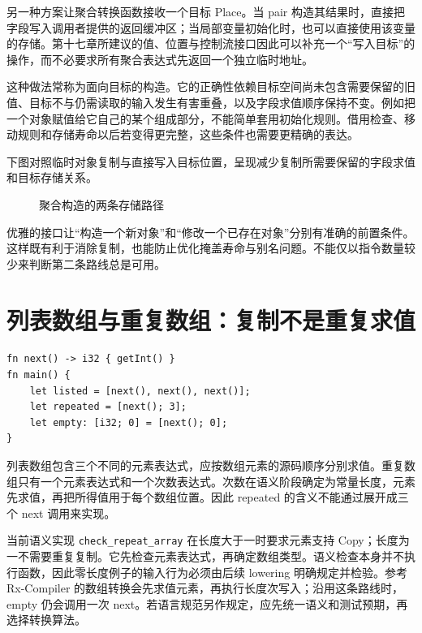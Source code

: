 另一种方案让聚合转换函数接收一个目标 Place。当 pair 构造其结果时，直接把字段写入调用者提供的返回缓冲区；当局部变量初始化时，也可以直接使用该变量的存储。第十七章所建议的值、位置与控制流接口因此可以补充一个“写入目标”的操作，而不必要求所有聚合表达式先返回一个独立临时地址。

这种做法常称为面向目标的构造。它的正确性依赖目标空间尚未包含需要保留的旧值、目标不与仍需读取的输入发生有害重叠，以及字段求值顺序保持不变。例如把一个对象赋值给它自己的某个组成部分，不能简单套用初始化规则。借用检查、移动规则和存储寿命以后若变得更完整，这些条件也需要更精确的表达。

下图对照临时对象复制与直接写入目标位置，呈现减少复制所需要保留的字段求值和目标存储关系。
\begin{figure}[htbp]\centering
{}
\caption{聚合构造的两条存储路径}
\end{figure}

优雅的接口让“构造一个新对象”和“修改一个已存在对象”分别有准确的前置条件。这样既有利于消除复制，也能防止优化掩盖寿命与别名问题。不能仅以指令数量较少来判断第二条路线总是可用。

\section{列表数组与重复数组：复制不是重复求值}
\begin{lstlisting}[language=Rustless,caption={三种数组初始化形成不同的执行要求}]
fn next() -> i32 { getInt() }
fn main() {
    let listed = [next(), next(), next()];
    let repeated = [next(); 3];
    let empty: [i32; 0] = [next(); 0];
}
\end{lstlisting}
列表数组包含三个不同的元素表达式，应按数组元素的源码顺序分别求值。重复数组只有一个元素表达式和一个次数表达式。次数在语义阶段确定为常量长度，元素先求值，再把所得值用于每个数组位置。因此 repeated 的含义不能通过展开成三个 next 调用来实现。

当前语义实现 \texttt{check\_repeat\_array} 在长度大于一时要求元素支持 Copy；长度为一不需要重复复制。它先检查元素表达式，再确定数组类型。语义检查本身并不执行函数，因此零长度例子的输入行为必须由后续 lowering 明确规定并检验。参考 Rx-Compiler 的数组转换会先求值元素，再执行长度次写入；沿用这条路线时，empty 仍会调用一次 next。若语言规范另作规定，应先统一语义和测试预期，再选择转换算法。

